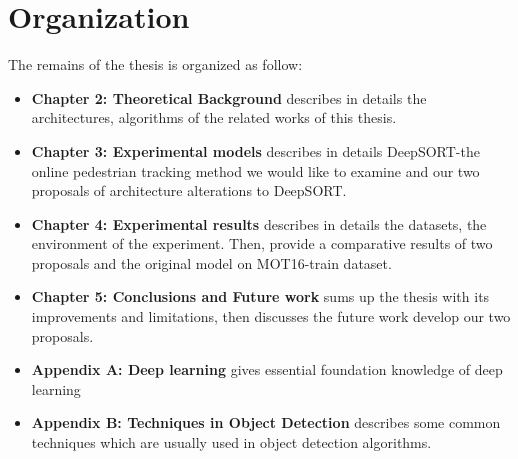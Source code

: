 \section{Organization}
The remains of the thesis is organized as follow:
\begin{itemize}[label={}]
  \item \textbf{Chapter 2: Theoretical Background} describes in details the architectures, algorithms of the related works of this thesis.
  \item \textbf{Chapter 3: Experimental models} describes in details DeepSORT\cite{Wojke2017simple}-the online pedestrian tracking method we would like to examine
  and our two proposals of architecture alterations to DeepSORT\cite{Wojke2017simple}.
  \item \textbf{Chapter 4: Experimental results} describes in details the datasets, the environment of the experiment. 
  Then, provide a comparative results of two proposals and the original model on MOT16-train dataset.
  \item \textbf{Chapter 5: Conclusions and Future work} sums up the thesis with its improvements and limitations, 
  then discusses the future work develop our two proposals.
  \item \textbf{Appendix A: Deep learning} gives essential foundation knowledge of deep learning
  \item \textbf{Appendix B: Techniques in Object Detection} describes some common techniques which are usually used in object detection algorithms.
\end{itemize}